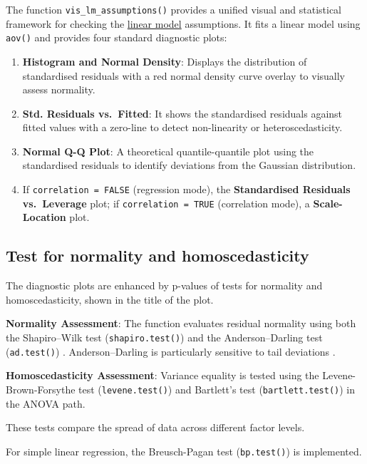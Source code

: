 The function \texttt{vis\_lm\_assumptions()} provides a unified visual and statistical framework for checking the \hyperref[glm]{linear model} assumptions.
It fits a linear model using \texttt{aov()} and provides four standard diagnostic plots:

\begin{enumerate}
\def\labelenumi{\arabic{enumi}.}
\item
  \textbf{Histogram and Normal Density}: Displays the distribution of standardised residuals with a red normal density curve overlay to visually assess normality.
\item
  \textbf{Std. Residuals vs.~Fitted}: It shows the standardised residuals against fitted values with a zero-line to detect non-linearity or heteroscedasticity.
\item
  \textbf{Normal Q-Q Plot}: A theoretical quantile-quantile plot using the standardised residuals to identify deviations from the Gaussian distribution.
\item
  If \texttt{correlation\ =\ FALSE} (regression mode), the \textbf{Standardised Residuals vs.~Leverage} plot; if \texttt{correlation\ =\ TRUE} (correlation mode), a \textbf{Scale-Location} plot.
\end{enumerate}

\subsection{Test for normality and homoscedasticity}\label{test-for-normality-and-homoscedasticity}

The diagnostic plots are enhanced by p-values of tests for normality and homoscedasticity, shown in the title of the plot.

\textbf{Normality Assessment}: The function evaluates residual normality using both the Shapiro--Wilk test (\texttt{shapiro.test()}) and the Anderson--Darling test (\texttt{ad.test()}) \citep{Gross:2015}.
Anderson--Darling is particularly sensitive to tail deviations \citep{Razali:2011, Yap:2011}.

\textbf{Homoscedasticity Assessment}: Variance equality is tested using the Levene-Brown-Forsythe test (\texttt{levene.test()}) \citep{Brown:1974} and Bartlett's test (\texttt{bartlett.test()}) in the ANOVA path.

These tests compare the spread of data across different factor levels.

For simple linear regression, the Breusch-Pagan test (\texttt{bp.test()}) is implemented.


